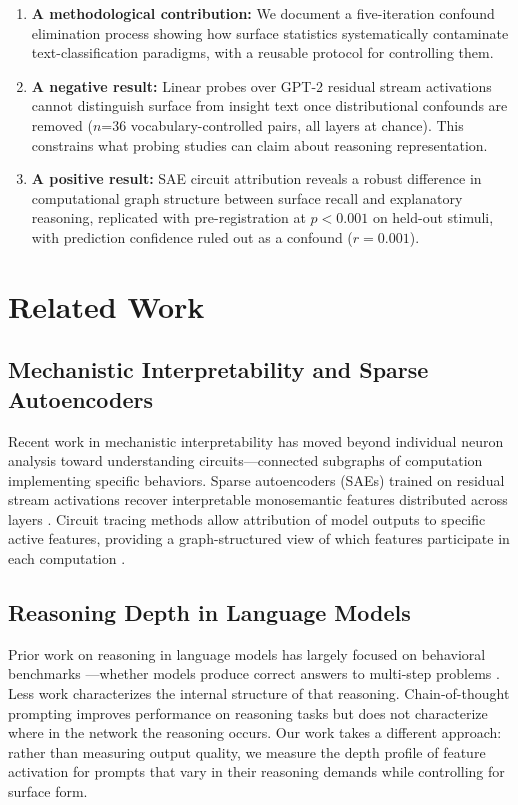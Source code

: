 \documentclass{article}
\begin{document}
\begin{enumerate}
\item \textbf{A methodological contribution:} We document a five-iteration confound 
elimination process showing how surface statistics systematically contaminate 
text-classification paradigms, with a reusable protocol for controlling them.

\item \textbf{A negative result:} Linear probes over GPT-2 residual stream activations cannot 
distinguish surface from insight text once distributional confounds are removed ($n$=36 
vocabulary-controlled pairs, all layers at chance). This constrains what probing studies can 
claim about reasoning representation.

\item \textbf{A positive result:} SAE circuit attribution reveals a robust difference in 
computational graph structure between surface recall and explanatory reasoning, replicated 
with pre-registration at $p < 0.001$ on held-out stimuli, with prediction confidence ruled 
out as a confound ($r = 0.001$).
\end{enumerate}

\section{Related Work}

\subsection{Mechanistic Interpretability and Sparse Autoencoders}

Recent work in mechanistic interpretability has moved beyond individual neuron analysis 
toward understanding circuits---connected subgraphs of computation implementing specific 
behaviors. Sparse autoencoders (SAEs) trained on residual stream activations recover 
interpretable monosemantic features distributed across layers 
\citep{cunningham2023, templeton2024}. Circuit tracing methods allow attribution of model 
outputs to specific active features, providing a graph-structured view of which features 
participate in each computation \citep{lindsey2025}.

\subsection{Reasoning Depth in Language Models}

Prior work on reasoning in language models has largely focused on behavioral benchmarks
---whether models produce correct answers to multi-step problems 
\citep{wei2022, kojima2022}. Less work characterizes the internal structure of that 
reasoning. Chain-of-thought prompting improves performance on reasoning tasks but does 
not characterize where in the network the reasoning occurs. Our work takes a different 
approach: rather than measuring output quality, we measure the depth profile of feature 
activation for prompts that vary in their reasoning demands while controlling for surface form.
\end{document}
